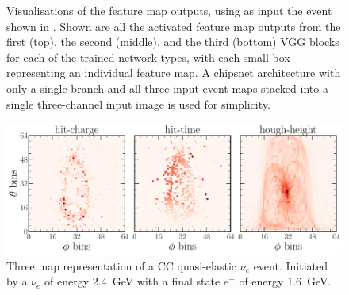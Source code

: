 \begin{figure}
{    }
    \quad
    \caption[Visualisations of trained feature map outputs]
    {Visualisations of the feature map outputs, using as input the event shown in
        . Shown are all the activated feature map outputs
        from the first (top), the second (middle), and the third (bottom) VGG blocks for each of
        the trained network types, with each small box representing an individual feature map. A
        chipsnet architecture with only a single branch and all three input event maps stacked
        into a single three-channel input image is used for simplicity.}
    \label{fig:cnn_visualisations}
\end{figure}

\begin{figure} %
    \includegraphics[width=\textwidth]{diagrams/7-results/explain_example_event.pdf}
    \caption[Example CC quasi-elastic $\nu_{e}$ event for explainability]
    {Three map representation of a CC quasi-elastic $\nu_{e}$ event. Initiated by a $\nu_{e}$ of
        energy \SI{2.4}{\GeV} with a final state $e^{-}$ of energy \SI{1.6}{\GeV}.}
    \label{fig:explain_example_event}
\end{figure}

